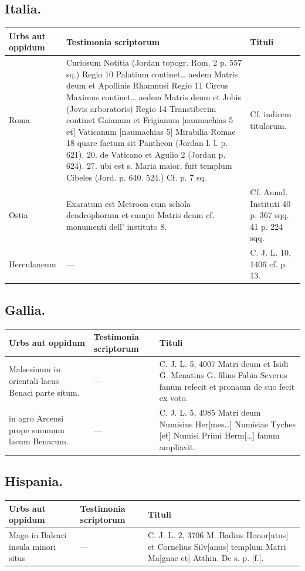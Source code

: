 \documentclass[a4paper, 11pt, oneside, polutonikogreek, german, twocolumn]{article}
\begin{document}
\subsection{Italia.}
\begin{table}[H]
    \centering
    \begin{tabular}{|p{45mm}|p{45mm}|p{40mm}|}
    \hline
        \textbf{Urbs aut oppidum} & \textbf{Testimonia scriptorum} & \textbf{Tituli} \\ \hline
        Roma & Curiosum Notitia (Jordan topogr. Rom. 2 p. 557 sq.) Regio 10 Palatium continet… aedem Matris deum et Apollinis Rhamnusi Regio 11 Circus Maximus continet… aedem Matris deum et Jobis (Jovis arboratoris) Regio 14 Transtiberim continet Gaianum et Frigianum [naumachias 5 et] Vaticanum [naumachias 5] Mirabilia Romae 18 quare factum sit Pantheon (Jordan l. l. p. 621). 20. de Vaticano et Agulio 2 (Jordan p. 624). 27. ubi est s. Maria maior, fuit templum Cibeles (Jord. p. 640. 524.) Cf. p. 7 sq. & Cf. indicem titulorum. \\ \hline
        Ostia & Exaratum est Metroon cum schola dendrophorum et campo Matris deum cf. monumenti dell’ instituto 8. & Cf. Annal. Instituti 40 p. 367 sqq. 41 p. 224 sqq. \\ \hline
        Herculaneum & --- & C. J. L. 10, 1406 cf. p. 13. \\ \hline
    \end{tabular}
\end{table}
\subsection{Gallia.}
\begin{table}[H]
    \centering
    \begin{tabular}{|p{45mm}|p{45mm}|p{60mm}|}
    \hline
        \textbf{Urbs aut oppidum} & \textbf{Testimonia scriptorum} & \textbf{Tituli} \\ \hline
        Malsesinum in orientali lacus Benaci parte situm. & --- & C. J. L. 5, 4007 Matri deum et Isidi G. Menatius G. filius Fabia Severus fanum refecit et pronaum de suo fecit ex voto. \\ \hline
        in agro Arcensi prope summum lacum Benacum. & --- & C. J. L. 5, 4985 Matri deum Numisius Her[mes…] Numisiae Tyches [et] Numisi Primi Herm[…] fanum ampliavit. \\ \hline
    \end{tabular}
\end{table}
\subsection{Hispania.}
\begin{table}[H]
    \centering
    \begin{tabular}{|p{45mm}|p{45mm}|p{60mm}|}
    \hline
        \textbf{Urbs aut oppidum} & \textbf{Testimonia scriptorum} & \textbf{Tituli} \\ \hline
        Mago in Baleari insula minori situs & --- & C. J. L. 2, 3706 M. Badius Honor[atus] et Cornelius Silv[anus] templum Matri Ma[gnae et] Atthin. De s. p. [f.]. \\ \hline
    \end{tabular}
\end{table}
\end{document}

